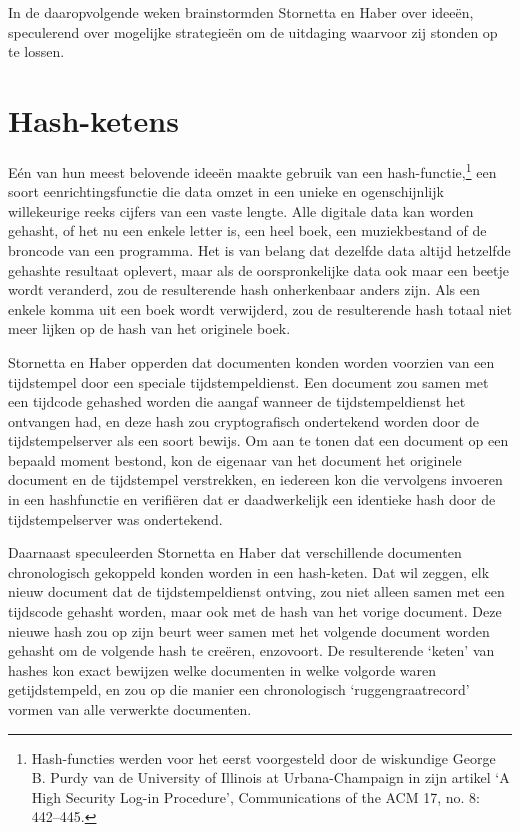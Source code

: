 \documentclass[
  a5paper,
  smalldemyvopaper,11pt,twoside,onecolumn,openright,extrafontsizes]{memoir}
\begin{document}
In de daaropvolgende weken brainstormden Stornetta en Haber over ideeën,
speculerend over mogelijke strategieën om de uitdaging waarvoor zij
stonden op te lossen.

\section{Hash-ketens}\label{hash-ketens}

Eén van hun meest belovende ideeën maakte gebruik van een
hash-functie,\footnote{Hash-functies werden voor het eerst voorgesteld
  door de wiskundige George B. Purdy van de University of Illinois at
  Urbana-Champaign in zijn artikel `A High Security Log-in Procedure',
  Communications of the ACM 17, no. 8: 442--445.} een soort
eenrichtingsfunctie die data omzet in een unieke en ogenschijnlijk
willekeurige reeks cijfers van een vaste lengte. Alle digitale data kan
worden gehasht, of het nu een enkele letter is, een heel boek, een
muziekbestand of de broncode van een programma. Het is van belang dat
dezelfde data altijd hetzelfde gehashte resultaat oplevert, maar als de
oorspronkelijke data ook maar een beetje wordt veranderd, zou de
resulterende hash onherkenbaar anders zijn. Als een enkele komma uit een
boek wordt verwijderd, zou de resulterende hash totaal niet meer lijken
op de hash van het originele boek.

Stornetta en Haber opperden dat documenten konden worden voorzien van
een tijdstempel door een speciale tijdstempeldienst. Een document zou
samen met een tijdcode gehashed worden die aangaf wanneer de
tijdstempeldienst het ontvangen had, en deze hash zou cryptografisch
ondertekend worden door de tijdstempelserver als een soort bewijs. Om
aan te tonen dat een document op een bepaald moment bestond, kon de
eigenaar van het document het originele document en de tijdstempel
verstrekken, en iedereen kon die vervolgens invoeren in een hashfunctie
en verifiëren dat er daadwerkelijk een identieke hash door de
tijdstempelserver was ondertekend.

Daarnaast speculeerden Stornetta en Haber dat verschillende documenten
chronologisch gekoppeld konden worden in een hash-keten. Dat wil zeggen,
elk nieuw document dat de tijdstempeldienst ontving, zou niet alleen
samen met een tijdscode gehasht worden, maar ook met de hash van het
vorige document. Deze nieuwe hash zou op zijn beurt weer samen met het
volgende document worden gehasht om de volgende hash te creëren,
enzovoort. De resulterende `keten' van hashes kon exact bewijzen welke
documenten in welke volgorde waren getijdstempeld, en zou op die manier
een chronologisch `ruggengraatrecord' vormen van alle verwerkte
documenten.
\end{document}
